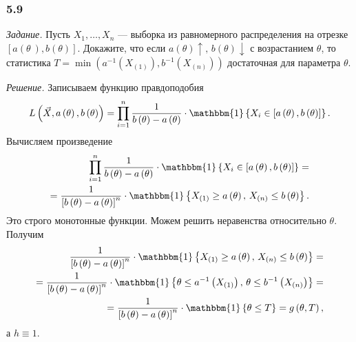 \subsubsection{5.9}

\textit{Задание.}
Пусть $X_1, \dotsc, X_n$ ---
выборка из равномерного распределения на отрезке
$ \left[ a \left( \theta\ \right), b \left( \theta \right) \right] $.
Докажите,
что если $a \left( \theta \right) \uparrow, \, b \left( \theta \right) \downarrow $ с возрастанием
$ \theta $,
то статистика
$T =
  \min \left(
    a^{-1} \left( X_{ \left( 1 \right) } \right), b^{-1} \left( X_{ \left( n \right) } \right)
  \right) $
достаточная для параметра $ \theta $.

\textit{Решение.} Записываем функцию правдоподобия
$$L \left( \vec{X}, a \left( \theta \right), b \left( \theta \right) \right) =
  \prod \limits_{i = 1}^n
    \frac{1}{b \left( \theta \right) - a \left( \theta \right) } \cdot
    \mathbbm{1} \left\{
      X_i \in \left[ a \left( \theta \right), b \left( \theta \right) \right]
    \right\}.$$
Вычисляем произведение
\begin{equation*}
  \begin{split}
    \prod \limits_{i = 1}^n
      \frac{1}{b \left( \theta \right) - a \left( \theta \right) } \cdot
      \mathbbm{1} \left\{
        X_i \in \left[ a \left( \theta \right), b \left( \theta \right) \right]
      \right\} = \\
    = \frac{1}{ \left[ b \left( \theta \right) - a \left( \theta \right) \right]^n} \cdot
    \mathbbm{1} \left\{
      X_{ \left( 1 \right) } \geq a \left( \theta \right), \,
      X_{ \left( n \right) } \leq b \left( \theta \right)
    \right\}.
  \end{split}
\end{equation*}
Это строго монотонные функции.
Можем решить неравенства относительно $ \theta $.
Получим
\begin{equation*}
  \begin{split}
    \frac{1}{ \left[ b \left( \theta \right) - a \left( \theta \right) \right]^n} \cdot
    \mathbbm{1} \left\{
      X_{ \left( 1 \right) } \geq a \left( \theta \right), \,
      X_{ \left( n \right) } \leq b \left( \theta \right)
    \right\} = \\
    = \frac{1}{ \left[ b \left( \theta \right) - a \left( \theta \right) \right]^n} \cdot
    \mathbbm{1} \left\{
      \theta \leq a^{-1} \left( X_{ \left( 1 \right) } \right), \,
      \theta \leq b^{-1} \left( X_{ \left( n \right) } \right)
    \right\} = \\
    = \frac{1}{ \left[ b \left( \theta \right) - a \left( \theta \right) \right]^n} \cdot
    \mathbbm{1} \left\{ \theta \leq T \right\} =
    g \left( \theta, T \right),
  \end{split}
\end{equation*}
а $h \equiv 1$.

